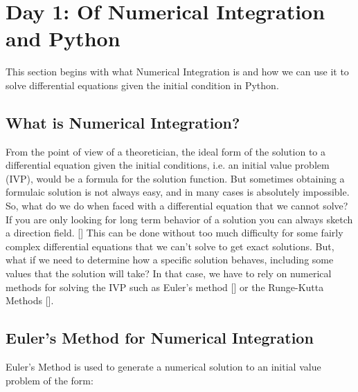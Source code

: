 \documentclass[10pt,letterpaper]{article}
\begin{document}


\section*{Day 1: Of Numerical Integration and Python}

This section begins with what Numerical Integration is and how we can use it to solve differential equations given the initial condition in Python.

\subsection*{What is Numerical Integration?}

From the point of view of a theoretician, the ideal form of the solution to a differential equation given the initial conditions, i.e. an initial value problem (IVP), would be a formula for the solution function. But sometimes obtaining a formulaic solution is not always easy, and in many cases is absolutely impossible. So, what do we do when faced with a differential equation that we cannot solve? If you are only looking for long term behavior of a solution you can always sketch a direction field. [] This can be done without too much difficulty for some fairly complex differential equations that we can’t solve to get exact solutions. But, what if we need to determine how a specific solution behaves, including some values that the solution will take? In that case, we have to rely on numerical methods for solving the IVP such as Euler's method [] or the Runge-Kutta Methods []. 

\subsection*{Euler's Method for Numerical Integration}

Euler's Method is used to generate a numerical solution to an initial value problem of the form:
\end{document}
